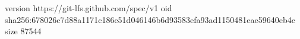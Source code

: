 version https://git-lfs.github.com/spec/v1
oid sha256:678026c7d88a1171c186e51d046146b6d93583efa93ad1150481eae59640eb4c
size 87544
